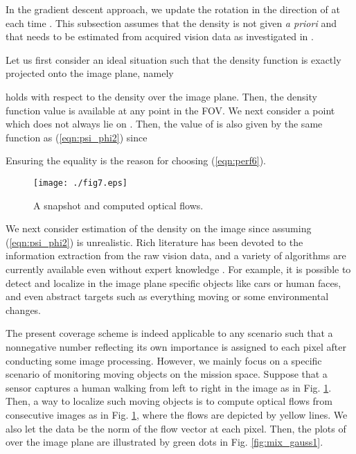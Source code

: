 \documentclass[conference,letterpaper]{ieeeconf}
\begin{document}
In the gradient descent approach,
we update the rotation 
in the direction of 
at each time .
This subsection assumes that
the density  is not given {\it a priori}
and that  needs to be estimated from acquired vision data
as investigated in \cite{EYE,IJRR}.







Let us first consider an ideal situation such that the density function
is exactly projected onto the image plane, namely

holds with respect to the density  over the image plane.
Then, the density function value  is available at
any point in the FOV.
We next consider a point 
which does not always lie on . 
Then, the value of  is also given by 
the same function as (\ref{eqn:psi_phi2}) since

Ensuring the equality is the reason for choosing 
(\ref{eqn:perf6}).



\begin{figure}
\begin{center}
\texttt{[image: ./fig7.eps]}
\caption{A snapshot and computed optical flows.}
\label{fig:snapshot}
\end{center}
\end{figure}















We next consider estimation of the density  on the image
since assuming (\ref{eqn:psi_phi2}) is unrealistic. 
Rich literature has been devoted to the
information extraction from the raw vision data,
and a variety of algorithms are currently available 
even without expert knowledge \cite{MATLAB1}.
For example, it is possible to detect and localize in the image plane
specific objects like cars or human faces, and even abstract targets such as everything moving 
or some environmental changes.



The present coverage scheme is indeed applicable to any scenario
such that a nonnegative number  reflecting 
its own importance is assigned to each pixel 
after conducting some image processing.
However, we mainly focus on a specific scenario of
monitoring moving objects on the mission space.
Suppose that a sensor captures a human walking from 
left to right in the image as in Fig. \ref{fig:snapshot}.
Then, a way to localize such moving objects is to
compute optical flows from consecutive images as in Fig. \ref{fig:snapshot},
where the flows are depicted by yellow lines.
We also let the data  be the norm of the flow vector
at each pixel.
Then, the plots of  over the image plane 
are illustrated by green dots in  Fig. \ref{fig:mix_gauss1}.
\end{document}
